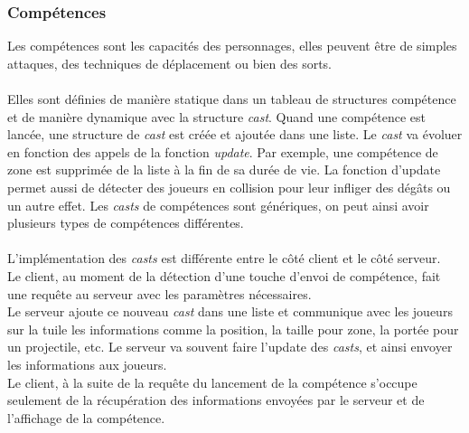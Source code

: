 \documentclass[11pt]{article}
\begin{document}
            \subsubsection{Compétences}
            Les compétences sont les capacités des personnages, elles peuvent être de simples attaques, des techniques de déplacement ou bien des sorts.\\\\
            Elles sont définies de manière statique dans un tableau de structures compétence et de manière dynamique avec la structure \textit{cast}. Quand une compétence est lancée, une structure de \textit{cast} est créée et ajoutée dans une liste. Le \textit{cast} va évoluer en fonction des appels de la fonction \textit{update}. Par exemple, une compétence de zone est supprimée de la liste à la fin de sa durée de vie. La fonction d’update permet aussi de détecter des joueurs en collision pour leur infliger des dégâts ou un autre effet. Les \textit{casts} de compétences sont génériques, on peut ainsi avoir plusieurs types de compétences différentes.\\\\
            L’implémentation des \textit{casts} est différente entre le côté client et le côté serveur.\\
            Le client, au moment de la détection d’une touche d’envoi de compétence, fait une requête au serveur avec les paramètres nécessaires.\\
            Le serveur ajoute ce nouveau \textit{cast} dans une liste et communique avec les joueurs sur la tuile les informations comme la position, la taille pour zone, la portée pour un projectile, etc.
            Le serveur va souvent faire l’update des \textit{casts}, et ainsi envoyer les informations aux joueurs.\\
            Le client, à la suite de la requête du lancement de la compétence s’occupe seulement de la récupération des informations envoyées par le serveur et de l’affichage de la compétence.
            
\end{document}

